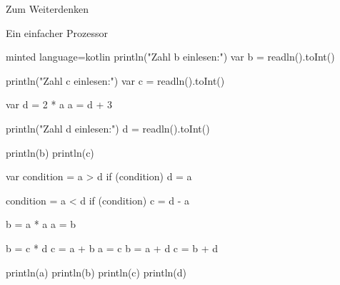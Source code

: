 \begin{task}[points=auto]{Zum Weiterdenken }
\begin{subtask*}[points=0]{Ein einfacher Prozessor}
\begin{solution}
\begin{codeBlock}[]{minted language=kotlin}
                println("Zahl b einlesen:")
                var b = readln().toInt()

                println("Zahl c einlesen:")
                var c = readln().toInt()

                var d = 2 * a
                a = d + 3

                println("Zahl d einlesen:")
                d = readln().toInt()

                println(b)
                println(c)

                var condition = a > d
                if (condition) {
                    d = a
                }

                condition = a < d
                if (condition) {
                    c = d - a
                }

                b = a * a
                a = b

                b = c * d
                c = a + b
                a = c
                b = a + d
                c = b + d

                println(a)
                println(b)
                println(c)
                println(d)
            \end{codeBlock}
        \end{solution}
    \end{subtask*}
\end{task}

